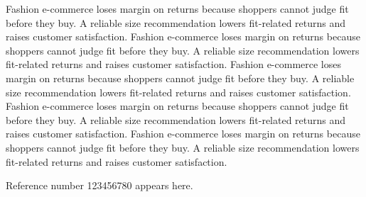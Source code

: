 \documentclass[a4paper,11pt]{article}
\begin{document}
Fashion e-commerce loses margin on returns because shoppers cannot judge fit before they buy. A reliable size recommendation lowers fit-related returns and raises customer satisfaction. Fashion e-commerce loses margin on returns because shoppers cannot judge fit before they buy. A reliable size recommendation lowers fit-related returns and raises customer satisfaction. Fashion e-commerce loses margin on returns because shoppers cannot judge fit before they buy. A reliable size recommendation lowers fit-related returns and raises customer satisfaction. Fashion e-commerce loses margin on returns because shoppers cannot judge fit before they buy. A reliable size recommendation lowers fit-related returns and raises customer satisfaction. Fashion e-commerce loses margin on returns because shoppers cannot judge fit before they buy. A reliable size recommendation lowers fit-related returns and raises customer satisfaction. \par Reference number 123456780 appears here.
\end{document}
